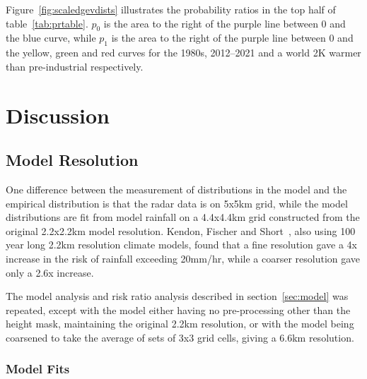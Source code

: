 Figure~\ref{fig:scaledgevdists} illustrates the probability ratios in the top half of table~\ref{tab:prtable}.
$p_0$ is the area to the right of the purple line between 0 and the blue curve,
    while $p_1$ is the area to the right of the purple line between 0 and the yellow, green and red curves for
    the 1980s, 2012--2021 and a world 2K warmer than pre-industrial respectively.


\section{Discussion}\label{sec:discussion}

\begin{comment}
This section should give a picture of what you have taken out of your
project and how you can put it into context.

This section should summarise the results obtained, detail conclusions
reached, suggest future work, and changes that you would make if you
repeated the project.
\end{comment}

\subsection{Model Resolution}\label{subsec:dismodeldef}

One difference between the measurement of distributions in the model and the empirical distribution is that the radar data is on 5x5km grid,
    while the model distributions are fit from model rainfall on a 4.4x4.4km grid constructed from the original 2.2x2.2km model resolution.
Kendon, Fischer and Short~\cite{Kendon_Fischer_Short_2023}, also using 100 year long 2.2km resolution climate models,
    found that a fine resolution gave a 4x increase in the risk of rainfall exceeding 20mm/hr,
    while a coarser resolution gave only a 2.6x increase.

The model analysis and risk ratio analysis described in section~\ref{sec:model} was repeated,
    except with the model either having no pre-processing other than the height mask,
    maintaining the original 2.2km resolution,
    or with the model being coarsened to take the average of sets of 3x3 grid cells,
    giving a 6.6km resolution.

\subsubsection{Model Fits}

